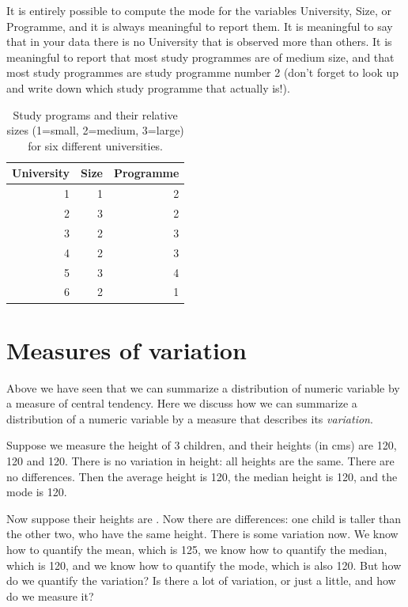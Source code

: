\documentclass[]{book}\usepackage[]{graphicx}\usepackage[]{color}
\begin{document}
It is entirely possible to compute the mode for the variables University, Size, or Programme, and it is always meaningful to report them. It is meaningful to say that in your data there is no University that is observed more than others. It is meaningful to report that most study programmes are of medium size, and that most study programmes are study programme number 2 (don't forget to look up and write down which study programme that actually is!).



\begin{table}[ht]
\centering
\caption{Study programs and their relative sizes (1=small, 2=medium, 3=large) for six different universities.} 
\label{tab:modemedian}
\begin{tabular}{rrr}
  \hline
University & Size & Programme \\ 
  \hline
1 & 1 & 2 \\ 
  2 & 3 & 2 \\ 
  3 & 2 & 3 \\ 
  4 & 2 & 3 \\ 
  5 & 3 & 4 \\ 
  6 & 2 & 1 \\ 
   \hline
\end{tabular}
\end{table}





\section{Measures of variation}

Above we have seen that we can summarize a distribution of numeric variable by a measure of central tendency. Here we discuss how we can summarize a distribution of a numeric variable by a measure that describes its \textit{variation}.

Suppose we measure the height of 3 children, and their heights (in cms) are 120, 120 and 120. There is no variation in height: all heights are the same. There are no differences. Then the average height is 120, the median height is 120, and the mode is 120.

Now suppose their heights are . Now there are differences: one child is taller than the other two, who have the same height. There is some variation now. We know how to quantify the mean, which is 125, we know how to quantify the median, which is 120, and we know how to quantify the mode, which is also 120. But how do we quantify the variation? Is there a lot of variation, or just a little, and how do we measure it?
\end{document}
